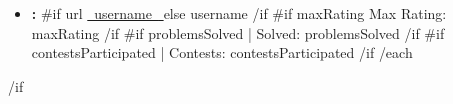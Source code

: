 \documentclass[10pt,a4paper]{article}
\begin{document}
\begin{itemize}
    {{#each codingProfiles}}
    \item
    \textbf{:}
    {{#if url}}
    \href{ {{~url~}} }{ {{~username~}} }
    {{else}}
    {{username}}
    {{/if}}
    {{#if maxRating}}
    \enspace Max Rating: {{maxRating}}
    {{/if}}
    {{#if problemsSolved}}
    \enspace | \enspace Solved: {{problemsSolved}}
    {{/if}}
    {{#if contestsParticipated}}
    \enspace | \enspace Contests: {{contestsParticipated}}
    {{/if}}
    {{/each}}
\end{itemize}

{{/if}}
\end{document}
